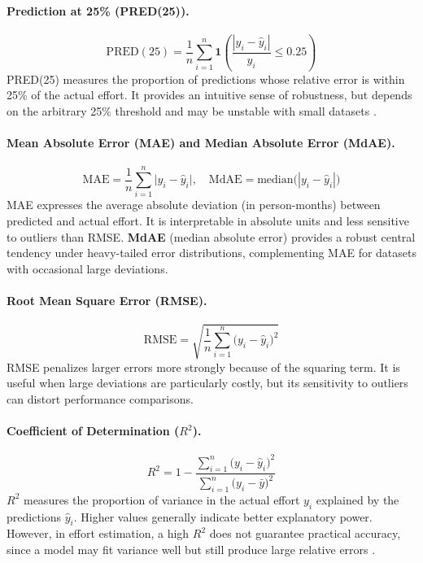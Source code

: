 \documentclass{ieeeaccess}
\begin{document}
\paragraph{Prediction at 25\% (PRED(25)).}
\begin{equation}
\mathrm{PRED}(25) = \frac{1}{n}\sum_{i=1}^{n}\mathbf{1}\!\left(\frac{|y_i-\hat{y}_i|}{y_i}\le 0.25\right)
\label{eq:pred25}
\end{equation}
PRED(25) measures the proportion of predictions whose relative error is 
within 25\% of the actual effort. It provides an intuitive sense of 
robustness, but depends on the arbitrary 25\% threshold and may be 
unstable with small datasets \cite{kitchenham2001evaluating}.

\paragraph{Mean Absolute Error (MAE) and Median Absolute Error (MdAE).}
\begin{equation}
\mathrm{MAE} = \frac{1}{n}\sum_{i=1}^{n}\bigl|y_i-\hat{y}_i\bigr|, \quad
\mathrm{MdAE} = \text{median}\bigl(|y_i-\hat{y}_i|\bigr)
\label{eq:mae-mdae}
\end{equation}
MAE expresses the average absolute deviation (in person-months) between 
predicted and actual effort. It is interpretable in absolute units and less 
sensitive to outliers than RMSE. \textbf{MdAE} (median absolute error) provides 
a robust central tendency under heavy-tailed error distributions, 
complementing MAE for datasets with occasional large deviations.

\paragraph{Root Mean Square Error (RMSE).}
\begin{equation}
\mathrm{RMSE} = \sqrt{\frac{1}{n}\sum_{i=1}^{n}\bigl(y_i-\hat{y}_i\bigr)^2}
\label{eq:rmse}
\end{equation}
RMSE penalizes larger errors more strongly because of the squaring term. 
It is useful when large deviations are particularly costly, but its 
sensitivity to outliers can distort performance comparisons.

\paragraph{Coefficient of Determination ($R^2$).}
\begin{equation}
R^2 = 1 - \frac{\sum_{i=1}^{n}\bigl(y_i-\hat{y}_i\bigr)^2}{\sum_{i=1}^{n}\bigl(y_i-\bar{y}\bigr)^2}
\label{eq:r2}
\end{equation}
$R^2$ measures the proportion of variance in the actual effort $y_i$ 
explained by the predictions $\hat{y}_i$. Higher values generally indicate 
better explanatory power. However, in effort estimation, a high $R^2$ does 
not guarantee practical accuracy, since a model may fit variance well but 
still produce large relative errors \cite{kitchenham2001evaluating}.
\end{document}
